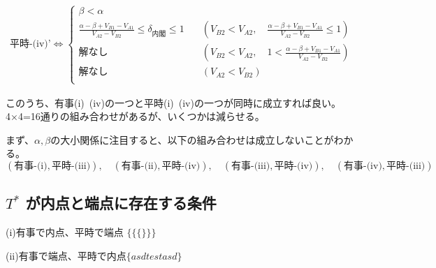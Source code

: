 \documentclass[main.tex]{subfiles}
\begin{document}
\begin{align*}
    \text{平時-(iv)'} \Leftrightarrow 
    \begin{cases}
        \beta < \alpha \\[1em]
        \frac{\alpha-\beta + V_{B1}-V_{A1}}{V_{A2} - V_{B2}} \le \delta_{内閣} \le 1  \quad &( V_{B2} < V_{A2} ,\quad \frac{\alpha-\beta + V_{B1}-V_{A1}}{V_{A2} - V_{B2}} \le 1) \\[1em]
        解なし  \quad &( V_{B2} < V_{A2} ,\quad 1 < \frac{\alpha-\beta + V_{B1}-V_{A1}}{V_{A2} - V_{B2}}) \\[1em]
        解なし \quad &( V_{A2} < V_{B2} )\\[1em]
    \end{cases}
\end{align*}


このうち、有事(i)~(iv)の一つと平時(i)~(iv)の一つが同時に成立すれば良い。4×4=16通りの組み合わせがあるが、いくつかは減らせる。

まず、$\alpha, \beta$の大小関係に注目すると、以下の組み合わせは成立しないことがわかる。
$$(\text{有事-(i)}, \text{平時-(iii)}),\quad (\text{有事-(ii)}, \text{平時-(iv)}),\quad (\text{有事-(iii)}, \text{平時-(iv)}),\quad (\text{有事-(iv)}, \text{平時-(iii)})$$






\subsection{$T^*$ が内点と端点に存在する条件}

(i)有事で内点、平時で端点 $\Big\{  \big\{ \{\} \big\} \Big\} $

(ii)有事で端点、平時で内点$\lbrace asd   test asd \rbrace$


\theendnotes %
\end{document}
